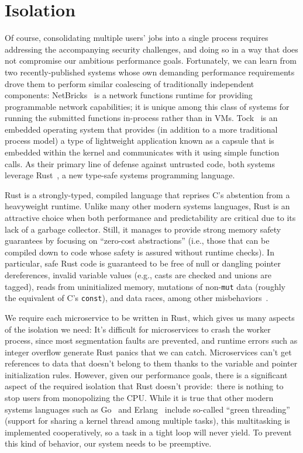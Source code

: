 \section{Isolation}
\label{sec:isolation}


Of course, consolidating multiple users' jobs into a single process requires
addressing the accompanying security challenges, and doing so in a way that
does not compromise our ambitious performance goals.
Fortunately, we can learn from two recently-published systems whose own demanding
performance requirements drove them to perform similar coalescing of traditionally
independent components:  NetBricks~\cite{Panda2016} is a network functions runtime
for providing programmable network capabilities; it is unique among this class of
systems for running the submitted functions in-process rather than in VMs.
Tock~\cite{Levy2017} is an embedded operating system that provides (in addition to a
more traditional process model) a type of lightweight application known as a capsule
that is embedded within the kernel and communicates with it using simple function
calls.  As their primary line of defense against untrusted code, both systems
leverage Rust~\cite{www-rustlang}, a new type-safe systems programming language.

Rust is a strongly-typed, compiled language that reprises C's abstention from a
heavyweight runtime.  Unlike many other modern systems languages, Rust is an
attractive choice when both performance and predictability are critical due to its
lack of a garbage collector.  Still, it manages to provide strong memory safety
guarantees by focusing on ``zero-cost abstractions'' (i.e., those that can be
compiled down to code whose safety is assured without runtime checks).  In
particular, safe Rust code is guaranteed to be free of null or dangling pointer
dereferences, invalid variable values (e.g., casts are checked and unions are
tagged), reads from uninitialized memory, mutations of non-\texttt{mut} data (roughly
the equivalent of C's \texttt{const}), and data races, among other
misbehaviors~\cite{www-rustlang-ub}.

We require each microservice to be written in Rust, which gives us many aspects of
the isolation we need:  It's difficult for microservices to crash the worker process,
since most segmentation faults are prevented, and runtime errors such as integer
overflow generate Rust panics that we can catch.  Microservices can't get references
to data that doesn't belong to them thanks to the variable and pointer initialization
rules.  However, given our performance goals, there is a significant aspect of the
required isolation that Rust doesn't provide:\ there is nothing to stop users from
monopolizing the CPU.  While it is true that other modern systems languages such as
Go~\cite{www-golang} and Erlang~\cite{www-erlang} include so-called ``green
threading'' (support for sharing a kernel thread among multiple tasks), this
multitasking is implemented cooperatively, so a task in a tight loop will never
yield.  To prevent this kind of behavior, our system needs to be preemptive.

